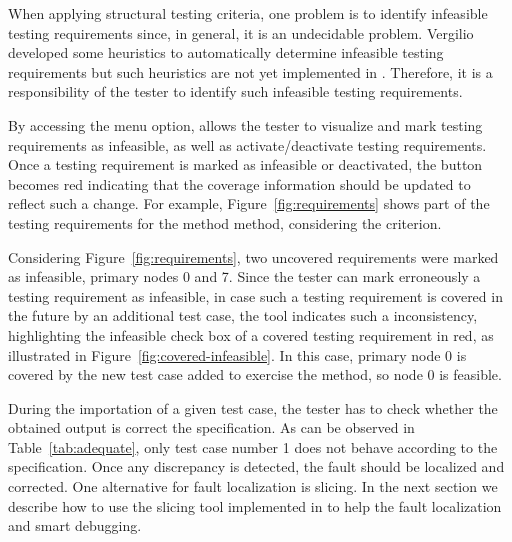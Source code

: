 When applying structural testing criteria, one problem is to
identify infeasible testing requirements since, in general, it is
an undecidable problem. Vergilio~\cite{Vergilio97CRCA} developed
some heuristics to automatically determine infeasible testing
requirements but such heuristics are not yet implemented in
\toolname. Therefore, it is a responsibility of the tester to
identify such infeasible testing requirements.

By accessing the  menu option, \toolname allows the tester to visualize
and mark testing requirements as infeasible, as well as
activate/deactivate testing requirements. Once a testing
requirement is marked as infeasible or deactivated, the
 button becomes red indicating that the coverage
information should be updated to reflect such a change. For
example, Figure~\ref{fig:requirements} shows part of the testing
requirements for the method  method,
considering the  criterion.



Considering Figure~\ref{fig:requirements}, two uncovered
requirements were marked as infeasible, primary nodes 0 and 7.
Since the tester can mark erroneously a testing requirement as
infeasible, in case such a testing requirement is covered in the
future by an additional test case, the tool indicates such a
inconsistency, highlighting the infeasible check box of a covered
testing requirement in red, as illustrated in
Figure~\ref{fig:covered-infeasible}. In this case, primary node 0
is covered by the new test case added to exercise the
 method, so node 0 is feasible.

During the importation of a given test case, the tester has to
check whether the obtained output is correct \wrt the
specification. As can be observed in Table~\ref{tab:adequate},
only test case number 1 does not behave according to the
specification. Once any discrepancy is detected, the fault should
be localized and corrected. One alternative for fault localization
is slicing. In the next section we describe how to use the slicing
tool implemented in \toolname to help the fault localization and
smart debugging.



\afterpage{\clearpage}
\newpage
